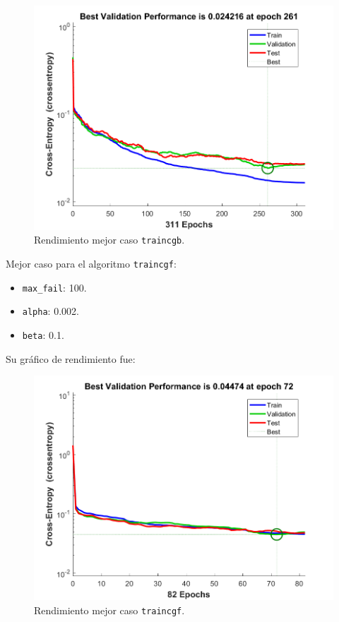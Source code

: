 \documentclass[a4paper,12pt,titlepage]{article}
\begin{document}
\begin{figure}[!ht]
	\centering
	\label{fig:traincgb}
	\includegraphics[width=\textwidth]{traincgb50000101.png}
	\caption{Rendimiento mejor caso \lstinline|traincgb|.}
\end{figure}

\newpage

Mejor caso para el algoritmo \lstinline|traincgf|:

\begin{itemize}[noitemsep]
	\item \lstinline|max_fail|: 100.
	\item \lstinline|alpha|: 0.002.
	\item \lstinline|beta|: 0.1.
\end{itemize}

Su gráfico de rendimiento fue:

\begin{figure}[!ht]
	\centering
	\label{fig:traincgb}
	\includegraphics[width=\textwidth]{traincgf10000201.png}
	\caption{Rendimiento mejor caso \lstinline|traincgf|.}
\end{figure}
\end{document}
